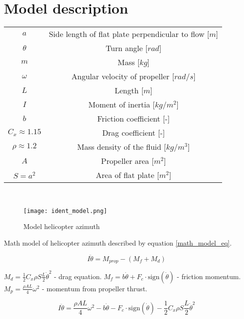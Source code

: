 \section{Model description}

\begin{tabular}{ |c|c| }
    \hline
    $a$                 & Side length of flat plate perpendicular to flow [$m$]\\
    $\theta$            & Turn angle [$rad$]\\
    $m$                 & Mass [$kg$]\\
    $\omega$            & Angular velocity of propeller [$rad/s$]\\
    $L$                 & Length [$m$]\\
    $I$                 & Moment of inertia [$kg/m^2$]\\
    $b$                 & Friction coefficient [-]\\
    $C_x \approx 1.15$  & Drag coefficient [-]\\
    $\rho \approx 1.2$  & Mass density of the fluid [$kg/m^3$]\\
    $A$                 & Propeller area [$m^2$]\\
    $S = a^2$           & Area of flat plate [$m^2$] \\
    \hline
\end{tabular} \\

\begin{figure}[htb!]
    \centering
    \texttt{[image: ident\_model.png]}
    \caption{Model helicopter azimuth}
    \label{fig:ident_model}
\end{figure}
Math model of helicopter azimuth described by equation \ref{math_model_eq}.

\begin{equation}
    I\ddot{\theta} = M_{prop} - (M_f + M_d)
\end{equation}

$M_d = \frac{1}{2} C_x \rho S \frac{L}{2}\dot{\theta}^2$ -  
drag equation.
$M_f =  b\dot{\theta} + F_c \cdot \text{sign}(\dot{\theta})$ - friction momentum.
$M_p = \frac{\rho AL}{4}\omega^2$ - momentum from propeller thrust.

\begin{equation}\label{math_model_eq}
    I\ddot{\theta} = \frac{\rho AL}{4}\omega^2 - b\dot{\theta} - F_c \cdot \text{sign}(\dot{\theta})
    - \frac{1}{2}C_x \rho S \frac{L}{2}\dot{\theta}^2 
\end{equation}

